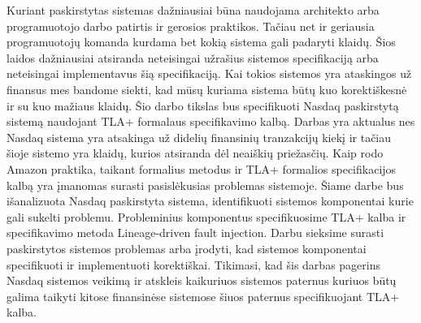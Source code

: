 \documentclass{VUMIFPSmagistrinis}
\begin{document}
\tableofcontents

	Kuriant paskirstytas sistemas dažniausiai būna naudojama architekto arba programuotojo darbo patirtis ir gerosios praktikos.
	Tačiau net ir geriausia programuotojų komanda kurdama bet kokią sistema gali padaryti klaidų.
	Šios laidos dažniausiai atsiranda neteisingai užrašius sistemos specifikaciją arba neteisingai implementavus šią specifikaciją.
	Kai tokios sistemos yra ataskingos už finansus mes bandome siekti, kad mūsų kuriama sistema būtų kuo korektiškesnė ir su kuo mažiaus klaidų.
	Šio darbo tikslas bus specifikuoti Nasdaq paskirstytą sistemą naudojant TLA+ formalaus specifikavimo kalbą.
	Darbas yra aktualus nes Nasdaq sistema yra atsakinga už didelių finansinių tranzakcijų kiekį ir tačiau šioje sistemo yra klaidų, kurios atsiranda dėl neaiškių priežasčių.
	Kaip rodo Amazon praktika, taikant formalius metodus ir TLA+ formalios specifikacijos kalbą yra įmanomas surasti pasislėkusias problemas sistemoje.
	Šiame darbe bus išanalizuota Nasdaq paskirstyta sistema, identifikuoti sistemos komponentai kurie gali sukelti problemu.
	Probleminius komponentus specifikuosime TLA+ kalba ir specifikavimo metoda Lineage-driven fault injection.
	Darbu sieksime surasti paskirstytos sistemos problemas arba įrodyti, kad sistemos komponentai specifikuoti ir implementuoti korektiškai.
	Tikimasi, kad šis darbas pagerins Nasdaq sistemos veikimą ir atskleis kaikuriuos sistemos paternus kuriuos būtų galima taikyti kitose finansinėse sistemose šiuos paternus specifikuojant TLA+ kalba.



\printbibliography[heading=bibintoc]  %


\appendix  %
\end{document}
